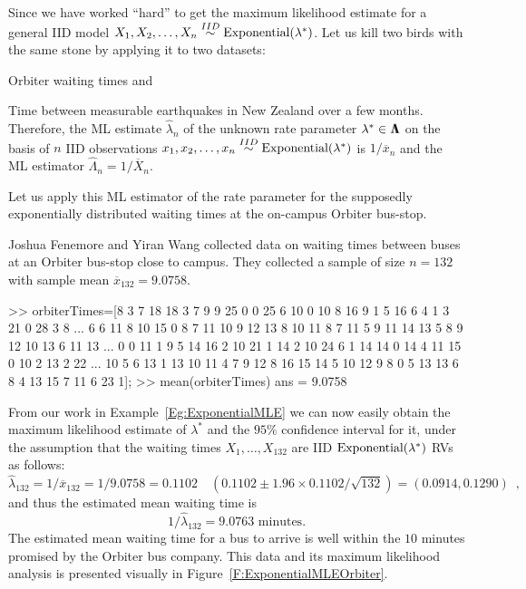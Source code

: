 Since we have worked ``hard'' to get the maximum likelihood estimate for a general IID model $X_1,X_2,\ldots,X_n \overset{IID}{\sim} \mbox{{\rm Exponential}}(\lambda^*)$.  Let us kill two birds with the same stone by applying it to two datasets:
\be
\item Orbiter waiting times and
\item Time between measurable earthquakes in New Zealand over a few months.
\ee
Therefore, the ML estimate $\widehat{\lambda}_n$ of the unknown rate parameter $\lambda^* \in {\Lambda}\mspace{-11 mu}{\Lambda}$ on the basis of $n$ IID observations $x_1,x_2,\ldots,x_n \overset{IID}{\sim} \mbox{{\rm Exponential}}(\lambda^*)$ is $1/\overline{x}_n$ and the ML estimator $\widehat{\Lambda}_n=1/\overline{X}_n$.  

\begin{example}\label{EgOrbiterMLE}
Let us apply this ML estimator of the rate parameter for the supposedly exponentially distributed waiting times at the on-campus Orbiter bus-stop.

Joshua Fenemore and Yiran Wang collected data on waiting times between buses at an Orbiter bus-stop close to campus.  
They collected a sample of size $n=132$ with sample mean $\overline{x}_{132}=9.0758$.
\begin{VrbM}
>> orbiterTimes=[8 3 7 18 18 3 7 9 9 25 0 0 25 6 10 0 10 8 16 9 1 5 16 6 4 1 3 21 0 28 3 8 ...
 6 6 11 8 10 15 0 8 7 11 10 9 12 13 8 10 11 8 7 11 5 9 11 14 13 5 8 9 12 10 13 6 11 13 ...
 0 0 11 1 9 5 14 16 2 10 21 1 14 2 10 24 6 1 14 14 0 14 4 11 15 0 10 2 13 2 22 ...
 10 5 6 13 1 13 10 11 4 7 9 12 8 16 15 14 5 10 12 9 8 0 5 13 13 6 8 4 13 15 7 11 6 23 1];
>> mean(orbiterTimes)
ans =
    9.0758
\end{VrbM}

From our work in Example~\ref{Eg:ExponentialMLE} we can now easily obtain the maximum likelihood estimate of $\lambda^*$ and the $95\%$ confidence interval for it, under the assumption that the waiting times $X_1,\ldots,X_{132}$ are IID $\mbox{{\rm Exponential}}(\lambda^*)$ RVs as follows: 
$$\widehat{\lambda}_{132}=1/\overline{x}_{132}=1/9.0758=0.1102 \quad 
(0.1102 \pm 1.96 \times 0.1102/\sqrt{132}) = (0.0914,0.1290) \enspace ,$$ 
and thus the estimated mean waiting time is 
$$1/\widehat{\lambda}_{132}=9.0763 \text{ minutes} .$$  
The estimated mean waiting time for a bus to arrive is well within the $10$ minutes promised by the Orbiter bus company.  
This data and its maximum likelihood analysis is presented visually in Figure~\ref{F:ExponentialMLEOrbiter}.
 

\end{example}
